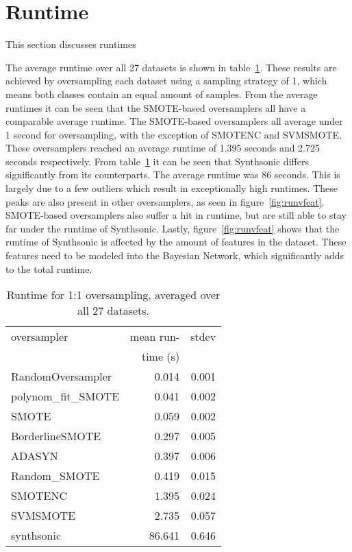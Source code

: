 \section{Runtime}
This section discusses runtimes

The average runtime over all 27 datasets is shown in table~\ref{tab:runtimes}. These results are achieved by oversampling each dataset using a sampling strategy of 1, which means both classes contain an equal amount of samples. From the average runtimes it can be seen that the SMOTE-based oversamplers all have a comparable average runtime. The SMOTE-based oversamplers all average under 1 second for oversampling, with the exception of SMOTENC and SVMSMOTE. These oversamplers reached an average runtime of 1.395 seconds and 2.725 seconds respectively. From table~\ref{tab:runtimes} it can be seen that Synthsonic differs significantly from its counterparts. The average runtime was 86 seconds. This is largely due to a few outliers which result in exceptionally high runtimes. These peaks are also present in other oversamplers, as seen in figure~\ref{fig:runvfeat}. SMOTE-based oversamplers also suffer a hit in runtime, but are still able to stay far under the runtime of Synthsonic. Lastly, figure~\ref{fig:runvfeat} shows that the runtime of Synthsonic is affected by the amount of features in the dataset. These features need to be modeled into the Bayesian Network, which significantly adds to the total runtime.

\begin{table}[]
    \centering
    \begin{tabular}{lrr}
    \toprule
    oversampler & mean run-  &  stdev \\
     & time (s) & \\
    \midrule
    RandomOversampler &    0.014 &        0.001 \\
    polynom\_fit\_SMOTE &    0.041 &        0.002 \\
    SMOTE             &    0.059 &        0.002 \\
    BorderlineSMOTE   &    0.297 &        0.005 \\
    ADASYN            &    0.397 &        0.006 \\
    Random\_SMOTE      &    0.419 &        0.015 \\
    SMOTENC           &    1.395 &        0.024 \\
    SVMSMOTE          &    2.735 &        0.057 \\
    synthsonic        &   86.641 &        0.646 \\
    \bottomrule
    \end{tabular}
    \caption{Runtime for 1:1 oversampling, averaged over all 27 datasets.}
    \label{tab:runtimes}
\end{table}

